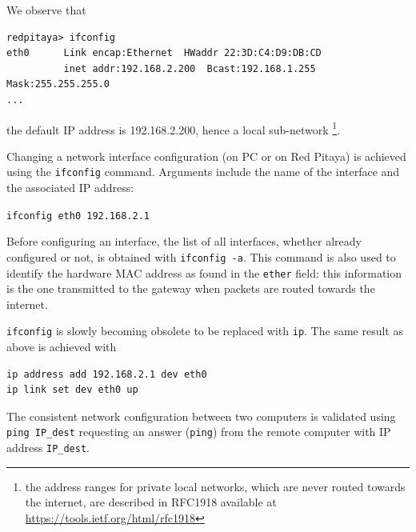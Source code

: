 \documentclass{article}
\begin{document}
We observe that
{\footnotesize
\begin{verbatim}
redpitaya> ifconfig                                                             
eth0      Link encap:Ethernet  HWaddr 22:3D:C4:D9:DB:CD                         
          inet addr:192.168.2.200  Bcast:192.168.1.255  Mask:255.255.255.0       
...
\end{verbatim}
}
the default IP address is 192.168.2.200, hence a local sub-network
\footnote{the address ranges for private local networks, which are never
routed towards the internet, are described in RFC1918 available at
\url{https://tools.ietf.org/html/rfc1918}}.

Changing a network interface configuration (on PC or on Red Pitaya) is achieved using the
{\tt ifconfig} command. Arguments include the name of the interface and the associated IP address:

{\verb!ifconfig eth0 192.168.2.1!}

Before configuring an interface, the list of all interfaces, whether already configured or not,
is obtained with {\verb!ifconfig -a!}. This command is also used to identify the hardware
MAC address as found in the {\tt ether} field: this information is the one transmitted to the
gateway when packets are routed towards the internet.

{\tt ifconfig} is slowly becoming obsolete to be replaced with {\tt ip}. The same result as
above is achieved with 
\begin{verbatim}
ip address add 192.168.2.1 dev eth0
ip link set dev eth0 up
\end{verbatim}

{\color{red}The consistent network configuration between two computers is validated
using {\tt ping IP\_dest} requesting an answer ({\tt ping}) from the remote computer
with IP address {\tt IP\_dest}.}
\end{document}
